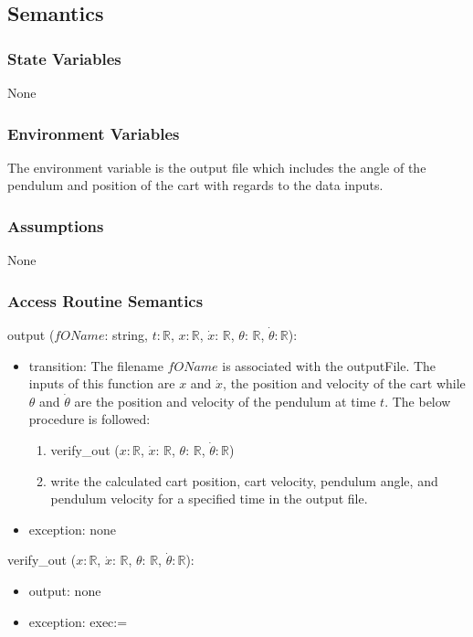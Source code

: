 \documentclass[12pt, titlepage]{article}
\begin{document}
\subsection{Semantics}

\subsubsection{State Variables}
None
\subsubsection{Environment Variables}
The environment variable is the output file which includes the angle of the pendulum and position of the cart with regards to the data inputs.

\subsubsection{Assumptions}
None
\subsubsection{Access Routine Semantics}


\noindent output ($fOName$: string, $t$$: \mathbb{R}$, $x$$: \mathbb{R}$, $\dot{x}$: $\mathbb{R}$, $\theta$: $\mathbb{R}$, $\dot{\theta}$$: 
 \mathbb{R}$):
\begin{itemize}

\item transition: The filename $fOName$ is associated with the outputFile. The inputs of this function are $x$ and $\dot{x}$, the position and velocity of the cart while $\theta$ and $\dot{\theta}$ are the position and velocity of the pendulum at time $t$.
The below procedure is followed:
\begin{enumerate}
\item verify\_out ($x$$: \mathbb{R}$, $\dot{x}$: $\mathbb{R}$, $\theta$: $\mathbb{R}$, $\dot{\theta}$$: 
 \mathbb{R}$)
\item write the calculated cart position, cart velocity, pendulum angle, and pendulum velocity for a specified time in the output file.
\end{enumerate}

\item exception: none 

\end{itemize}

\noindent verify\_out ($x$$: \mathbb{R}$, $\dot{x}$: $\mathbb{R}$, $\theta$: $\mathbb{R}$, $\dot{\theta}$$: \mathbb{R}$):
\begin{itemize}
\item output: none
\item exception: exec:= 
\end{itemize}
\end{document}
